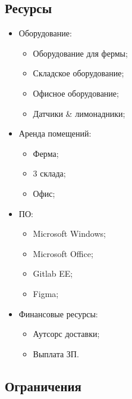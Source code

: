 \documentclass[a4paper,10pt]{article}
\begin{document}
\subsection{Ресурсы}
    \begin{itemize}
        \item Оборудование:
            \begin{itemize}
                \item Оборудование для фермы;
                \item Складское оборудование;
                \item Офисное оборудование;
                \item Датчики \& лимонадники;
            \end{itemize}

        \item Аренда помещений:
            \begin{itemize}
                \item Ферма;
                \item 3 склада;
                \item Офис;
            \end{itemize}

        \item ПО:
            \begin{itemize}
                \item Microsoft Windows;
                \item Microsoft Office;
                \item Gitlab EE;
                \item Figma;
            \end{itemize}

        \item Финансовые ресурсы:
            \begin{itemize}
                \item Аутсорс доставки;
                \item Выплата ЗП.
            \end{itemize}

    \end{itemize}


\subsection{Ограничения}
\end{document}
